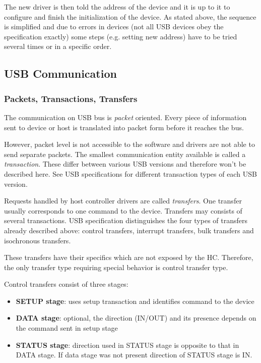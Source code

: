 The new driver is then told the address of the device and it is up to it to
configure and finish the initialization of the device.
As stated above, the sequence is simplified and due to errors in devices (not
all USB devices obey the specification exactly) some steps (e.g. setting new
address) have to be tried several times or in a specific order.

\subsection{USB Communication}

\subsubsection{Packets, Transactions, Transfers}

The communication on USB bus is \textit{packet} oriented. Every piece of
information sent to device or host is translated into packet form before it
reaches the bus.

However, packet level is not accessible to the software and drivers are not
able to send separate packets. The smallest communication entity available is
called a \textit{transaction}. These differ between various USB versions and
therefore won't be described here. See USB specifications for different
transaction types of each USB version.

Requests handled by host controller drivers are called \textit{transfers}. One
transfer usually corresponds to one command to the device. Transfers may
consists of several transactions. USB specification distinguishes the four
types of transfers already described above: control transfers, interrupt
transfers, bulk transfers and isochronous transfers.

These transfers have their specifics which are not exposed by the HC.
Therefore, the only transfer type requiring special behavior is control
transfer type.

Control transfers consist of three stages:
\begin{itemize}
\item \textbf{SETUP stage}: uses setup transaction and identifies command to
the device
\item \textbf{DATA stage}: optional, the direction (IN/OUT) and its presence
depends on the command sent in setup stage
\item \textbf{STATUS stage}: direction used in STATUS stage is opposite to that
in DATA stage. If data stage was not present direction of STATUS stage is IN.
\end{itemize}

